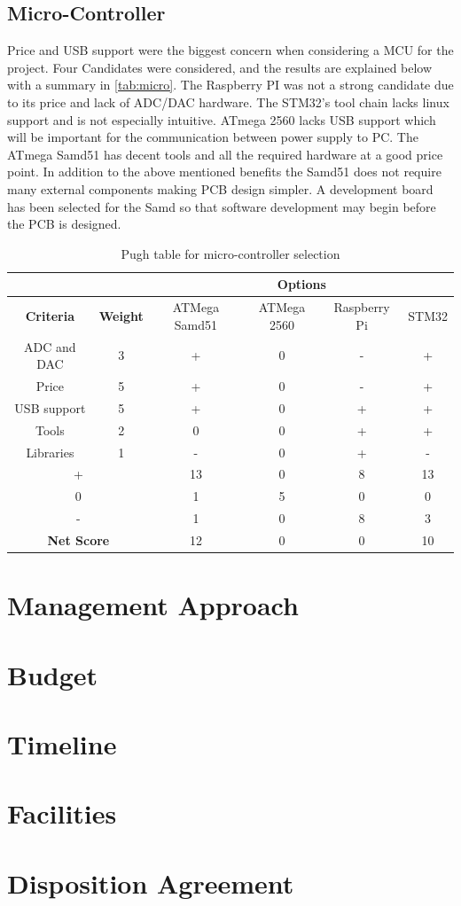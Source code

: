 \documentclass{article}
\begin{document}
\subsection {Micro-Controller}
Price and USB support were the biggest concern when considering a MCU for the project. 
Four Candidates were considered, and the results are explained below with a summary in 
\autoref{tab:micro}.
The Raspberry PI was not a strong candidate due to its price and lack of ADC/DAC
hardware. The STM32’s tool chain lacks linux support and is not especially intuitive. 
ATmega 2560 lacks USB support which will be important for the communication between 
power supply to PC. The ATmega Samd51 has decent tools and all the required hardware 
at a good price point. In addition to the above mentioned benefits the Samd51 does 
not require many external components making PCB design simpler. A development board 
has been selected for the Samd so that software development may begin before the PCB 
is designed.\\ 
\begin{table}[H]
    \centering
\begin{tabular}{ |c|c||c|c|c|c|  }
    \cline{3-6}
    \multicolumn{1}{c}{}& \multicolumn{1}{c}{}&  \multicolumn{4}{|c|}{\textbf{Options}} \\
    \hline
    \textbf{Criteria} & \textbf{Weight} & ATMega Samd51 & ATMega 2560 & Raspberry Pi & STM32 \\ 
    \hline
    ADC and DAC & 3 & + & 0 & - & + \\
    Price & 5 & + & 0 & - & + \\
    USB support & 5 & + & 0 & + & + \\
    Tools & 2 & 0 & 0 & + & + \\
    Libraries & 1 & - & 0 & + & - \\ 
    \hline
    \hline
    \multicolumn{2}{|c||}{+} & 13 & 0 & 8 & 13\\
    \multicolumn{2}{|c||}{0} & 1 & 5 & 0 & 0\\
    \multicolumn{2}{|c||}{-} & 1 & 0 & 8 & 3\\
    \hline \hline
    \multicolumn{2}{|c||}{\textbf{Net Score}} & 12 & 0 & 0 & 10\\
    \hline
\end{tabular}
\caption{Pugh table for micro-controller selection }
\label{tab:micro}
\end{table}
\section{Management Approach}
\section{Budget}
\section{Timeline}
\section{Facilities}
\section{Disposition Agreement}
\end{document}
